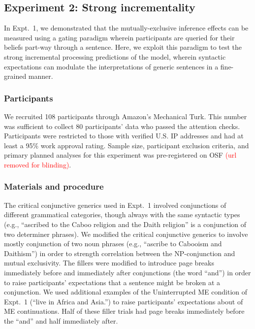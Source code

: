 \documentclass[10pt,letterpaper]{article}
\newcommand{\red}[1]{{\textcolor{Red}{#1}}}
\begin{document}
\subsection{Experiment 2: Strong incrementality}

In Expt.~1, we demonstrated that the mutually-exclusive inference effects can be measured using a gating paradigm wherein participants are queried for their beliefs part-way through a sentence. 
Here, we exploit this paradigm to test the strong incremental processing predictions of the model, wherein syntactic expectations can modulate the interpretations of generic sentences in a fine-grained manner. 

\subsubsection{Participants}

We recruited 108 participants through Amazon's Mechanical Turk.
This number was sufficient to collect 80 participants' data who passed the attention checks.  
Participants were restricted to those with verified U.S. IP addresses and had at least a 95\% work approval rating. 
Sample size, participant exclusion criteria, and primary planned analyses for this experiment was pre-registered on OSF \red{(url removed for blinding)}.

\subsubsection{Materials and procedure}

The critical conjunctive generics used in Expt.~1 involved conjunctions of different grammatical categories, though always with the same syntactic types (e.g., ``ascribed to the Caboo religion and the Daith religion'' is a conjunction of two determiner phrases). 
We modified the critical conjunctive generics to involve mostly conjunction of two noun phrases (e.g., ``ascribe to Cabooism and Daithism'') in order to strength correlation between the NP-conjunction and mutual exclusivity. 
The fillers were modified to introduce page breaks immediately before and immediately after conjunctions (the word ``and'') in order to raise participants' expectations that a sentence might be broken at a conjunction.
We used additional examples of the Uninterrupted ME condition of Expt.~1 (``live in Africa and Asia.'') to raise participants' expectations about of ME continuations.
Half of these filler trials had page breaks immediately before the ``and'' and half immediately after.
\end{document}
